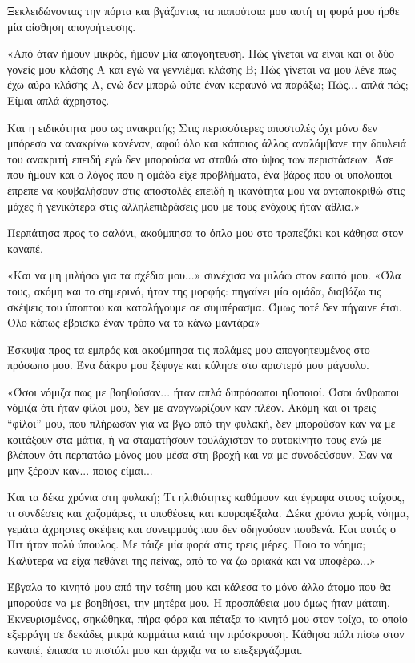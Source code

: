 \documentclass[12pt,twoside, openany]{book}
\begin{document}
Ξεκλειδώνοντας την πόρτα και βγάζοντας τα παπούτσια μου αυτή τη φορά μου ήρθε μία αίσθηση απογοήτευσης. 

«Από όταν ήμουν μικρός, ήμουν μία απογοήτευση. Πώς γίνεται να είναι και οι δύο γονείς μου κλάσης Α και εγώ να γεννιέμαι κλάσης Β; Πώς γίνεται να μου λένε πως έχω αύρα κλάσης Α, ενώ δεν μπορώ ούτε έναν κεραυνό να παράξω; Πώς... απλά πώς; Είμαι απλά άχρηστος.

Και η ειδικότητα μου ως ανακριτής; Στις περισσότερες αποστολές όχι μόνο δεν μπόρεσα να ανακρίνω κανέναν, αφού όλο και κάποιος άλλος αναλάμβανε την δουλειά του ανακριτή επειδή εγώ δεν μπορούσα να σταθώ στο ύψος των περιστάσεων. Άσε που ήμουν και ο λόγος που η ομάδα είχε προβλήματα, ένα βάρος που οι υπόλοιποι έπρεπε να κουβαλήσουν στις αποστολές επειδή η ικανότητα μου να ανταποκριθώ στις μάχες ή γενικότερα στις αλληλεπιδράσεις μου με τους ενόχους ήταν άθλια.»

Περπάτησα προς το σαλόνι, ακούμπησα το όπλο μου στο τραπεζάκι και κάθησα στον καναπέ.

«Και να μη μιλήσω για τα σχέδια μου...» συνέχισα να μιλάω στον εαυτό μου. «Όλα τους, ακόμη και το σημερινό, ήταν της μορφής: πηγαίνει μία ομάδα, διαβάζω τις σκέψεις του ύποπτου και καταλήγουμε σε συμπέρασμα. Όμως ποτέ δεν πήγαινε έτσι. Όλο κάπως έβρισκα έναν τρόπο να τα κάνω μαντάρα»

Έσκυψα προς τα εμπρός και ακούμπησα τις παλάμες μου απογοητευμένος στο πρόσωπο μου. Ένα δάκρυ μου ξέφυγε και κύλησε στο αριστερό μου μάγουλο.

«Όσοι νόμιζα πως με βοηθούσαν... ήταν απλά διπρόσωποι ηθοποιοί. Όσοι άνθρωποι νόμιζα ότι ήταν φίλοι μου, δεν με αναγνωρίζουν καν πλέον. Ακόμη και οι τρεις “φίλοι” μου, που πλήρωσαν για να βγω από την φυλακή, δεν μπορούσαν καν να με κοιτάξουν στα μάτια, ή να σταματήσουν τουλάχιστον το αυτοκίνητο τους ενώ με βλέπουν ότι περπατάω μόνος μου μέσα στη βροχή και να με συνοδεύσουν. Σαν να μην ξέρουν καν... ποιος είμαι...

Και τα δέκα χρόνια στη φυλακή; Τι ηλιθιότητες καθόμουν και έγραφα στους τοίχους, τι συνδέσεις και χαζομάρες, τι υποθέσεις και κουραφέξαλα. Δέκα χρόνια χωρίς νόημα, γεμάτα άχρηστες σκέψεις και συνειρμούς που δεν οδηγούσαν πουθενά. Και αυτός ο Πιτ ήταν πολύ ύπουλος. Με τάιζε μία φορά στις τρεις μέρες. Ποιο το νόημα; Καλύτερα να είχα πεθάνει της πείνας, από το να ζω οριακά και να υποφέρω...»

Έβγαλα το κινητό μου από την τσέπη μου και κάλεσα το μόνο άλλο άτομο που θα μπορούσε να με βοηθήσει, την μητέρα μου. Η προσπάθεια μου όμως ήταν μάταιη. Εκνευρισμένος, σηκώθηκα, πήρα φόρα και πέταξα το κινητό μου στον τοίχο, το οποίο εξερράγη σε δεκάδες μικρά κομμάτια κατά την πρόσκρουση. Κάθησα πάλι πίσω στον καναπέ, έπιασα το πιστόλι μου και άρχιζα να το επεξεργάζομαι.
\end{document}
